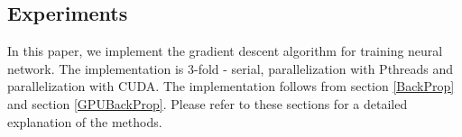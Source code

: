 \subsection{Experiments}
\label{sub:exp}
In this paper, we implement the gradient descent algorithm for training neural network. The implementation is 3-fold - serial, parallelization with Pthreads and parallelization with CUDA. The implementation follows from section \ref{BackProp} and section \ref{GPUBackProp}. Please refer to these sections for a detailed explanation of the methods.


